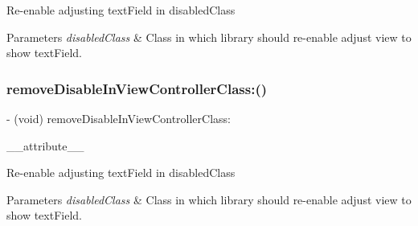 Re-\/enable adjusting text\+Field in disabled\+Class


\begin{DoxyParams}{Parameters}
{\em disabled\+Class} & Class in which library should re-\/enable adjust view to show text\+Field. \\
\hline
\end{DoxyParams}
\mbox{\label{interface_i_q_keyboard_manager_a816df2d7f4896490aba75e0e4172aca8}} 
\subsubsection{\texorpdfstring{remove\+Disable\+In\+View\+Controller\+Class\+:()}{removeDisableInViewControllerClass:()}\hspace{0.1cm}{\footnotesize\ttfamily [2/3]}}
{\footnotesize\ttfamily -\/ (void) remove\+Disable\+In\+View\+Controller\+Class\+: \begin{DoxyParamCaption}\item[{((deprecated(\char`\"{}This method is replaced with remove\+Disable\+Distance\+Handling\+In\+View\+Controller\+Class\+: method to adopt more graceful method name. Some developers confuses with this method name. This method will be removed in upcoming release.\char`\"{})))}]{\+\_\+\+\_\+attribute\+\_\+\+\_\+ }\end{DoxyParamCaption}}

Re-\/enable adjusting text\+Field in disabled\+Class


\begin{DoxyParams}{Parameters}
{\em disabled\+Class} & Class in which library should re-\/enable adjust view to show text\+Field. \\
\hline
\end{DoxyParams}
\mbox{\label{interface_i_q_keyboard_manager_a816df2d7f4896490aba75e0e4172aca8}} 
